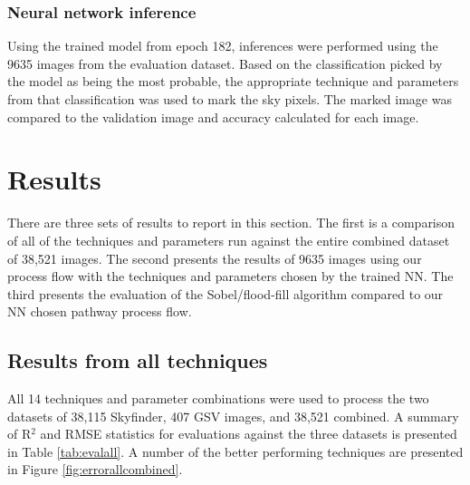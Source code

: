 \documentclass[final,3p,times,authoryear]{elsarticle}
\begin{document}
\subsubsection{Neural network inference}\label{sec:nninference}    
Using the trained model from epoch 182, inferences were performed using the 9635 images from the evaluation dataset. Based on the classification picked by the model as being the most probable, the appropriate technique and parameters from that classification was used to mark the sky pixels. The marked image was compared to the validation image and accuracy calculated for each image.

\section{Results}\label{sec:results}


There are three sets of results to report in this section. The first is a comparison of all of the techniques and parameters run against the entire combined dataset of 38,521 images. The second presents the results of 9635 images using our process flow with the techniques and parameters chosen by the trained NN. The third presents the evaluation of the Sobel/flood-fill algorithm compared to our NN chosen pathway process flow.

\subsection{Results from all techniques}\label{sec:resultsall}
All 14 techniques and parameter combinations were used to process the two datasets of 38,115 Skyfinder, 407 GSV images, and 38,521 combined. A summary of R$^{2}$ and RMSE statistics for evaluations against the three datasets is presented in Table \ref{tab:evalall}. A number of the better performing techniques are presented in Figure \ref{fig:errorallcombined}.
\end{document}
